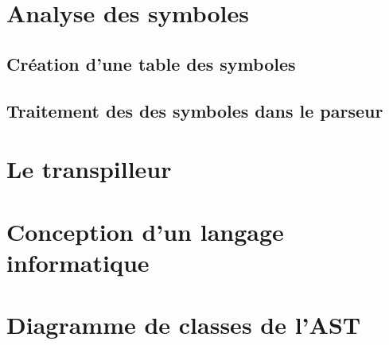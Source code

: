 \documentclass[a4paper]{article}%
\begin{document}
\section{Analyse des symboles}

\subsection{Création d'une table des symboles}
\subsection{Traitement des des symboles dans le parseur}

\section{Le transpilleur}

\section{Conception d'un langage informatique}

\printbibliography[keyword={paper},title={Biliographie}]
\printbibliography[keyword={web},title={Webographie}]

\appendix

\clearpage
\section{Diagramme de classes de l'AST}\label{appendix:classAST}

\begin{figure}[h]
  \begin{center}
  \end{center}
\end{figure}
\end{document}
